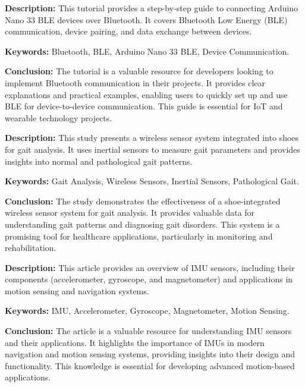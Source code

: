 {
	\textbf{Description:} This tutorial provides a step-by-step guide to connecting Arduino Nano 33 BLE devices over Bluetooth. It covers Bluetooth Low Energy (BLE) communication, device pairing, and data exchange between devices.
	\newline
	
	\textbf{Keywords:} Bluetooth, BLE, Arduino Nano 33 BLE, Device Communication.
	
	\newpage
	\textbf{Conclusion:} The tutorial is a valuable resource for developers looking to implement Bluetooth communication in their projects. It provides clear explanations and practical examples, enabling users to quickly set up and use BLE for device-to-device communication. This guide is essential for IoT and wearable technology projects\cite{Bagur2022}.
}

{
	\textbf{Description:} This study presents a wireless sensor system integrated into shoes for gait analysis. It uses inertial sensors to measure gait parameters and provides insights into normal and pathological gait patterns.
	\newline
	
	\textbf{Keywords:} Gait Analysis, Wireless Sensors, Inertial Sensors, Pathological Gait.
	
	\newpage
	\textbf{Conclusion:} The study demonstrates the effectiveness of a shoe-integrated wireless sensor system for gait analysis. It provides valuable data for understanding gait patterns and diagnosing gait disorders. This system is a promising tool for healthcare applications, particularly in monitoring and rehabilitation\cite{Bamberg:2008}.
}

{
	\textbf{Description:} This article provides an overview of IMU sensors, including their components (accelerometer, gyroscope, and magnetometer) and applications in motion sensing and navigation systems.
	\newline
	
	\textbf{Keywords:} IMU, Accelerometer, Gyroscope, Magnetometer, Motion Sensing.
	
	\newpage
	\textbf{Conclusion:} The article is a valuable resource for understanding IMU sensors and their applications. It highlights the importance of IMUs in modern navigation and motion sensing systems, providing insights into their design and functionality. This knowledge is essential for developing advanced motion-based applications\cite{Bosch:2024}.
}

